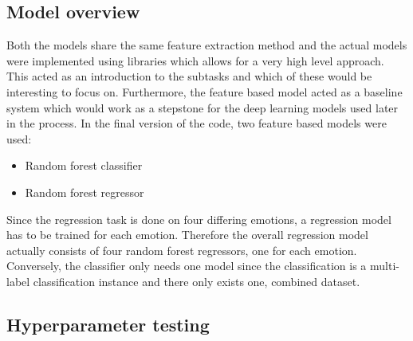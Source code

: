 \subsection{Model overview}
Both the models share the same feature extraction method and the actual models were implemented using libraries which allows for a very high level approach. This acted as an introduction to the subtasks and which of these would be interesting to focus on. Furthermore, the feature based model acted as a baseline system which would work as a stepstone for the deep learning models used later in the process. In the final version of the code, two feature based models were used:\\
\begin{itemize}
 \item Random forest classifier
 \item Random forest regressor
\end{itemize}
Since the regression task is done on four differing emotions, a regression model has to be trained for each emotion. Therefore the overall regression model actually consists of four random forest regressors, one for each emotion. Conversely, the classifier only needs one model since the classification is a multi-label classification instance and there only exists one, combined dataset.

\subsection{Hyperparameter testing}
